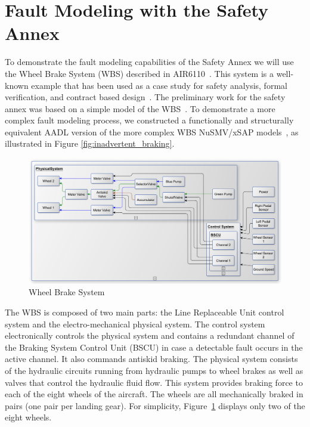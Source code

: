 \section{Fault Modeling with the Safety Annex}
\label{sec:fault_modeling}

To demonstrate the fault modeling capabilities of the Safety Annex we will use the Wheel Brake System (WBS) described in AIR6110~\cite{AIR6110}.  This system is a well-known example that has been used as a case study for safety analysis, formal verification, and contract based design~\cite{DBLP:conf/cav/BozzanoCPJKPRT15, 10.1007/978-3-319-11936-6-7, CAV2015:BoCiGrMa, Joshi05:SafeComp}. The preliminary work for the safety annex was based on a simple model of the WBS~\cite{Stewart17:IMBSA}. To demonstrate a more complex fault modeling process, we constructed a functionally and structurally equivalent AADL version of the more complex WBS NuSMV/xSAP models~\cite{DBLP:conf/cav/BozzanoCPJKPRT15}, as illustrated in Figure \ref{fig:inadvertent_braking}.     

\begin{figure}[t]
	\centering
	\includegraphics[trim=0 9 0 5,clip,width=.7\dimexpr\textwidth-2cm\relax]{images/wbs_arch4_diagram.pdf}
	\caption{Wheel Brake System}
	\label{fig:wbs}
\end{figure} 


The WBS is composed of two main parts: the Line Replaceable Unit control system and the electro-mechanical physical system.
The control system electronically controls the physical system and contains a redundant
channel of the Braking System Control Unit (BSCU) in case a detectable fault occurs in the active channel.
 It also commands antiskid braking. %
 The physical system consists of the hydraulic circuits running from hydraulic pumps to wheel brakes as well as valves that control the hydraulic fluid flow. This system provides braking force to each of the eight wheels of the aircraft. The wheels are all mechanically braked in pairs (one pair per landing gear). For simplicity, Figure~\ref{fig:wbs} displays only two of the eight wheels. 

